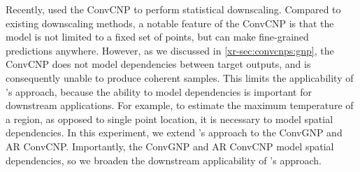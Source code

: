 \documentclass[12pt, twoside]{report}
\newcommand{\xrprefix}[1]{xr-#1}
\begin{document}
Recently, \textcite{Vaughan:2022:Convolutional_Conditional_Neural_Processes_for} used the ConvCNP to perform statistical downscaling.
Compared to existing downscaling methods, a notable feature of the ConvCNP is that the model is not limited to a fixed set of points, but can make fine-grained predictions anywhere.
However, as we discussed in \cref{\xrprefix{sec:convcnps:gnp}}, the ConvCNP does not model dependencies between target outputs, and is consequently unable to produce coherent samples.
This limits the applicability of \citeauthor{Vaughan:2022:Convolutional_Conditional_Neural_Processes_for}'s approach,
because the ability to model dependencies is important for downstream applications.
For example, to estimate the maximum temperature of a region, as opposed to single point location, it is necessary to model spatial dependencies.
In this experiment,
we extend \citeauthor{Vaughan:2022:Convolutional_Conditional_Neural_Processes_for}'s
approach to the ConvGNP and AR ConvCNP.
Importantly,
the ConvGNP and AR ConvCNP model spatial dependencies,
so we broaden the downstream applicability of \citeauthor{Vaughan:2022:Convolutional_Conditional_Neural_Processes_for}'s approach.
\end{document}
